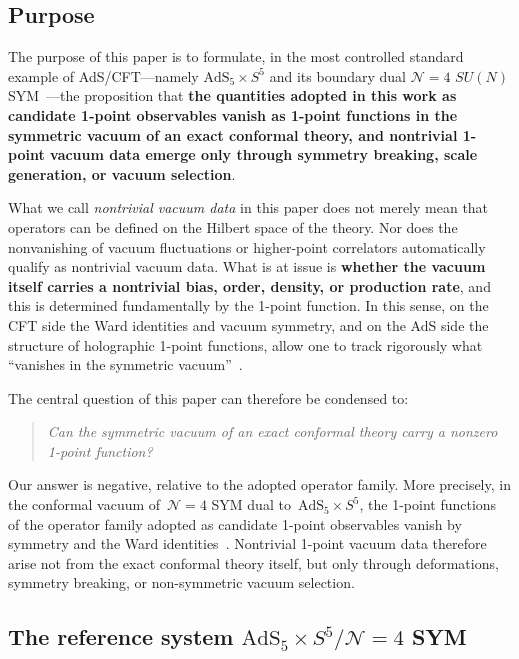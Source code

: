 \documentclass[
  aps,
  prd,
  preprint,
  groupedaddress,
  nofootinbib,
  longbibliography
]{revtex4-2}
\theoremstyle{remark}
\newcommand{\N}{\mathcal{N}}
\newcommand{\AdS}{\mathrm{AdS}}
\begin{document}
\subsection{Purpose}\label{subsec:1-1}

The purpose of this paper is to formulate, in the most
controlled standard example of AdS/CFT---namely
$\AdS_5\times S^5$ and its boundary dual
$\N=4$ $SU(N)$ SYM~\cite{ref1,ref2,ref3,ref4}---the
proposition that \textbf{the quantities adopted in this work
as candidate 1-point observables vanish as 1-point functions
in the symmetric vacuum of an exact conformal theory, and
nontrivial 1-point vacuum data emerge only through symmetry
breaking, scale generation, or vacuum selection}.

What we call \emph{nontrivial vacuum data} in this paper does
not merely mean that operators can be defined on the Hilbert
space of the theory.
Nor does the nonvanishing of vacuum fluctuations or
higher-point correlators automatically qualify as nontrivial
vacuum data.
What is at issue is \textbf{whether the vacuum itself carries
a nontrivial bias, order, density, or production rate},
and this is determined fundamentally by the 1-point function.
In this sense, on the CFT side the Ward identities and vacuum
symmetry, and on the AdS side the structure of holographic
1-point functions, allow one to track rigorously what
``vanishes in the symmetric vacuum''~\cite{ref2,ref3,ref5,ref9,ref10}.

The central question of this paper can therefore be condensed to:

\begin{quote}
\textit{Can the symmetric vacuum of an exact conformal theory
carry a nonzero 1-point function?}
\end{quote}

Our answer is negative, relative to the adopted
operator family.
More precisely, in the conformal vacuum of~$\N=4$ SYM dual
to~$\AdS_5\times S^5$, the 1-point functions of the operator
family adopted as candidate 1-point observables vanish by
symmetry and the Ward
identities~\cite{ref1,ref2,ref3,ref4,ref5,ref6,ref7,ref13,ref14}.
Nontrivial 1-point vacuum data therefore arise not from the
exact conformal theory itself, but only through deformations,
symmetry breaking, or non-symmetric vacuum selection.

\subsection{The reference system
  \texorpdfstring{$\AdS_5\times S^5/\N=4$}{AdS5 x S5 / N=4} SYM}%
  \label{subsec:1-2}
\end{document}
